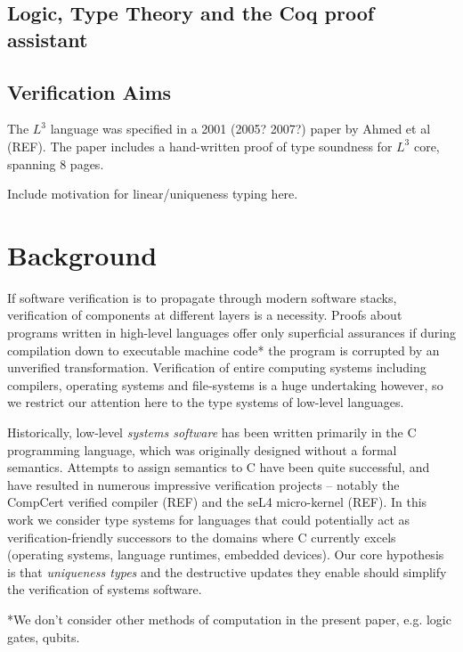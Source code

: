 \documentclass[]{unswthesis}
\begin{document}
\section{Logic, Type Theory and the Coq proof assistant}

\section{Verification Aims}

The $L^3$ language was specified in a 2001 (2005? 2007?) paper by Ahmed et al (REF). The paper includes a hand-written proof of type soundness for $L^3$ core, spanning 8 pages.

Include motivation for linear/uniqueness typing here.

\chapter{Background}
\label{ch:intro}


If software verification is to propagate through modern software stacks, verification of components at different layers is a necessity. Proofs about programs written in high-level languages offer only superficial assurances if during compilation down to executable machine code* the program is corrupted by an unverified transformation. Verification of entire computing systems including compilers, operating systems and file-systems is a huge undertaking however, so we restrict our attention here to the type systems of low-level languages.

Historically, low-level \textit{systems software} has been written primarily in the C programming language, which was originally designed without a formal semantics. Attempts to assign semantics to C have been quite successful, and have resulted in numerous impressive verification projects -- notably the CompCert verified compiler (REF) and the seL4 micro-kernel (REF). In this work we consider type systems for languages that could potentially act as verification-friendly successors to the domains where C currently excels (operating systems, language runtimes, embedded devices). Our core hypothesis is that \textit{uniqueness types} and the destructive updates they enable should simplify the verification of systems software.

*We don't consider other methods of computation in the present paper, e.g. logic gates, qubits.
\end{document}
